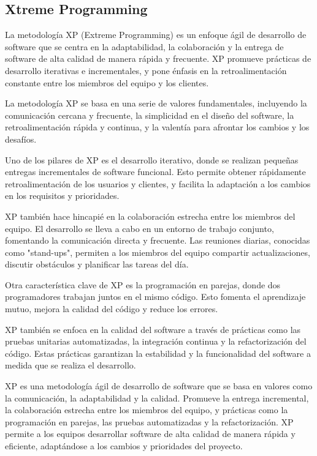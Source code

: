 \documentclass[12pt,a4paper]{article}
\newcommand{\espacio}{\par\vspace{3mm}}
\begin{document}
\subsection*{Xtreme Programming}
\espacio La metodología XP (Extreme Programming) es un enfoque ágil de desarrollo de software que se centra en la adaptabilidad, la colaboración y la entrega de software de alta calidad de manera rápida y frecuente. XP promueve prácticas de desarrollo iterativas e incrementales, y pone énfasis en la retroalimentación constante entre los miembros del equipo y los clientes.
\espacio La metodología XP se basa en una serie de valores fundamentales, incluyendo la comunicación cercana y frecuente, la simplicidad en el diseño del software, la retroalimentación rápida y continua, y la valentía para afrontar los cambios y los desafíos.
\espacio Uno de los pilares de XP es el desarrollo iterativo, donde se realizan pequeñas entregas incrementales de software funcional. Esto permite obtener rápidamente retroalimentación de los usuarios y clientes, y facilita la adaptación a los cambios en los requisitos y prioridades.
\espacio XP también hace hincapié en la colaboración estrecha entre los miembros del equipo. El desarrollo se lleva a cabo en un entorno de trabajo conjunto, fomentando la comunicación directa y frecuente. Las reuniones diarias, conocidas como "stand-ups", permiten a los miembros del equipo compartir actualizaciones, discutir obstáculos y planificar las tareas del día.
\espacio Otra característica clave de XP es la programación en parejas, donde dos programadores trabajan juntos en el mismo código. Esto fomenta el aprendizaje mutuo, mejora la calidad del código y reduce los errores.
\espacio XP también se enfoca en la calidad del software a través de prácticas como las pruebas unitarias automatizadas, la integración continua y la refactorización del código. Estas prácticas garantizan la estabilidad y la funcionalidad del software a medida que se realiza el desarrollo.
\espacio XP es una metodología ágil de desarrollo de software que se basa en valores como la comunicación, la adaptabilidad y la calidad. Promueve la entrega incremental, la colaboración estrecha entre los miembros del equipo, y prácticas como la programación en parejas, las pruebas automatizadas y la refactorización. XP permite a los equipos desarrollar software de alta calidad de manera rápida y eficiente, adaptándose a los cambios y prioridades del proyecto.
\end{document}
